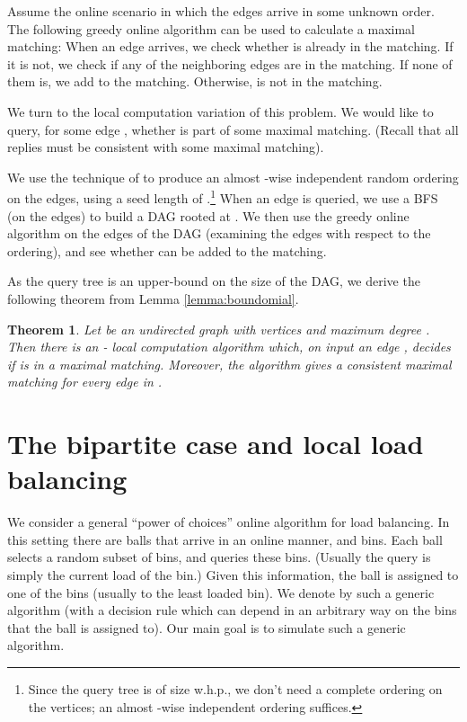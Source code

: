 \documentclass[english, oribibl]{llncs}
\newtheorem{theorem}{Theorem}[section]
\begin{document}
 Assume the online scenario in which  the edges arrive in some unknown order. The following greedy online algorithm can be used to calculate a maximal matching: When an edge  arrives, we check whether  is already in the matching. If it is not, we check if any of the neighboring edges are in the matching. If none of them is, we add  to the matching. Otherwise,  is not in the matching.

We turn to the local computation variation of this problem.  We would like to query, for  some edge , whether  is part of some maximal matching. (Recall that all replies must be consistent with some maximal matching).



We use the technique of \cite{ARV+11} to produce an almost -wise independent random ordering on the edges, using a seed length of .\footnote{Since the query tree is of size  w.h.p., we don't need a complete ordering on the vertices; an almost -wise independent ordering suffices.} When an edge  is queried, we use a BFS (on the edges) to build a DAG rooted at . We then use the greedy online algorithm on the edges of the DAG (examining the edges with respect to the ordering),  and see whether  can be added to the matching. 

As the query tree is an upper-bound on the size of the DAG,  we derive the following theorem from Lemma \ref{lemma:boundomial}.
\begin{theorem}
\label{thm:maximal}
Let  be an undirected graph with  vertices and maximum degree .
Then there is an 
   - local computation algorithm 
which, on input an edge , 
decides if  is in a maximal matching.
Moreover, the algorithm gives a consistent maximal matching
for every edge in .
\end{theorem}





\section{The bipartite case and local load balancing}
\label{section:load_balancing}

We consider a general ``power of  choices'' online algorithm for load balancing. In this setting there are  balls that arrive in an online manner, and  bins.
Each ball selects a random subset of  bins, and queries these bins. (Usually the query is simply the current load of the bin.) Given this information, the ball is assigned to one of the  bins (usually to the least loaded bin). We denote by  such a generic algorithm (with a decision rule which can depend in an arbitrary way on the  bins that the ball is assigned to). Our main goal is to simulate such a generic algorithm.
\end{document}
